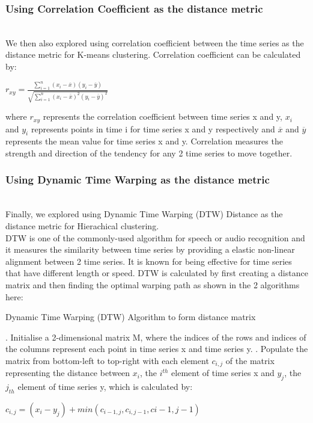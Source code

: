 \documentclass[nonblindrev,msom]{informs3} %
\begin{document}
\subsubsection{Using Correlation Coefficient as the distance metric}
\hfill\\
We then also explored using correlation coefficient between the time series as the distance metric for K-means clustering. Correlation coefficient can be calculated by: 

\begin{center}
$r_{xy} = \frac{\sum_{i=1}^{n} (x_i - \overline{x})(y_i - \overline{y})}
{\sqrt{\sum_{i=1}^{n} (x_i - \overline{x})^2(y_i - \overline{y})^2}} $
\end{center}

\noindent where $r_{xy}$ represents the correlation coefficient between time series x and y, $x_i$ and $y_i$ represents points in time i for time series x and y respectively and $\overline{x}$ and $\overline{y}$ represents the mean value for time series x and y. Correlation measures the strength and direction of the tendency for any 2 time series to move together. 

\subsubsection{Using Dynamic Time Warping as the distance metric}
\hfill\\
Finally, we explored using Dynamic Time Warping (DTW) Distance as the distance metric for Hierachical clustering. \\

\noindent DTW is one of the commonly-used algorithm for speech or audio recognition and it measures the similarity between time series by providing a elastic non-linear alignment between 2 time series. It is known for being effective for time series that have different length or speed. DTW is calculated by first creating a distance matrix and then finding the optimal warping path as shown in the 2 algorithms here:

\begin{algorithm}[H]
\caption{Dynamic Time Warping (DTW) Algorithm to form distance matrix}
\begin{algorithmic}
\STATE 
{}. Initialise a 2-dimensional matrix M, where the indices of the rows and indices of the columns represent each point in time series x and time series y. 
. Populate the matrix from bottom-left to top-right with each element $c_{i,j}$ of the matrix representing the distance between $x_i$, the $i^{th}$ element of time series x and $y_j$, the $j_{th}$ element of time series y, which is calculated by:

\begin{center}
$c_{i,j} = (x_i - y_j) + min(c_{i-1,j}, c_{i,j-1}, c{i-1,j-1})$
\end{center}

\end{algorithmic}
\end{algorithm}
\end{document}
